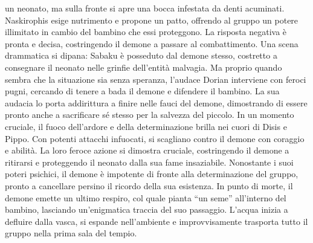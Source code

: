 un neonato, ma sulla fronte si apre una bocca infestata da denti
acuminati. Naskirophis esige nutrimento e propone un patto, offrendo al
gruppo un potere illimitato in cambio del bambino che essi proteggono.
La risposta negativa è pronta e decisa, costringendo il demone a passare
al combattimento. Una scena drammatica si dipana: Sabaku è posseduto dal
demone stesso, costretto a consegnare il neonato nelle grinfie
dell'entità malvagia. Ma proprio quando sembra che la situazione sia
senza speranza, l'audace Dorian interviene con feroci pugni, cercando di
tenere a bada il demone e difendere il bambino. La sua audacia lo porta
addirittura a finire nelle fauci del demone, dimostrando di essere
pronto anche a sacrificare sé stesso per la salvezza del piccolo. In un
momento cruciale, il fuoco dell'ardore e della determinazione brilla nei
cuori di Disis e Pippo. Con potenti attacchi infuocati, si scagliano
contro il demone con coraggio e abilità. La loro feroce azione si
dimostra cruciale, costringendo il demone a ritirarsi e proteggendo il
neonato dalla sua fame insaziabile. Nonostante i suoi poteri psichici,
il demone è impotente di fronte alla determinazione del gruppo, pronto a
cancellare persino il ricordo della sua esistenza. In punto di morte, il
demone emette un ultimo respiro, col quale pianta ``un seme''
all'interno del bambino, lasciando un'enigmatica traccia del suo
passaggio. L'acqua inizia a defluire dalla vasca, si espande
nell'ambiente e improvvisamente trasporta tutto il gruppo nella prima
sala del tempio.

